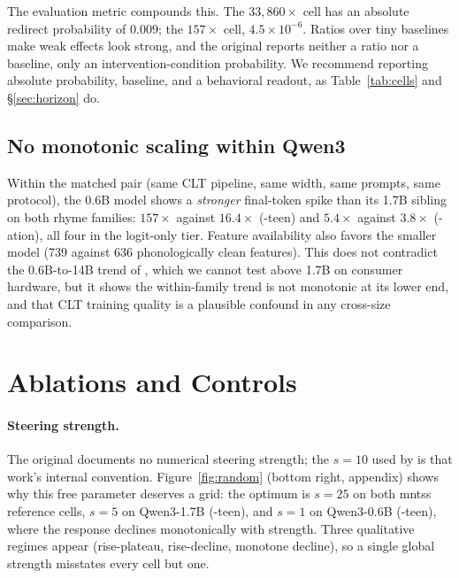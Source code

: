 \documentclass[11pt]{article}
\begin{document}
The evaluation metric compounds this. The $33{,}860\times$ cell has an absolute redirect probability of $0.009$; the $157\times$ cell, $4.5\times10^{-6}$. Ratios over tiny baselines make weak effects look strong, and the original reports neither a ratio nor a baseline, only an intervention-condition probability. We recommend reporting absolute probability, baseline, and a behavioral readout, as Table~\ref{tab:cells} and \S\ref{sec:horizon} do.

\subsection{No monotonic scaling within Qwen3}

Within the matched pair (same CLT pipeline, same width, same prompts, same protocol), the 0.6B model shows a \emph{stronger} final-token spike than its 1.7B sibling on both rhyme families: $157\times$ against $16.4\times$ (-teen) and $5.4\times$ against $3.8\times$ (-ation), all four in the logit-only tier. Feature availability also favors the smaller model (739 against 636 phonologically clean features). This does not contradict the 0.6B-to-14B trend of \citet{hanna2026latent}, which we cannot test above 1.7B on consumer hardware, but it shows the within-family trend is not monotonic at its lower end, and that CLT training quality is a plausible confound in any cross-size comparison.

\section{Ablations and Controls}
\label{sec:ablations}

\paragraph{Steering strength.}
The original documents no numerical steering strength; the $s{=}10$ used by \citet{jacopin2026prolepsis} is that work's internal convention. Figure~\ref{fig:random} (bottom right, appendix) shows why this free parameter deserves a grid: the optimum is $s{=}25$ on both mntss reference cells, $s{=}5$ on Qwen3-1.7B (-teen), and $s{=}1$ on Qwen3-0.6B (-teen), where the response declines monotonically with strength. Three qualitative regimes appear (rise-plateau, rise-decline, monotone decline), so a single global strength misstates every cell but one.
\end{document}
